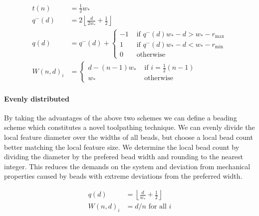 \begin{align*}
t(n) &= \frac12 w_* \\
q^-(d) &= 2 \left\lfloor \frac{d}{ 2w_*} + \frac12 \right\rfloor \\
q(d) &= q^-(d) +
\begin{cases}
-1 & \text{ if } q^-(d) w_* - d > w_* - r_\text{max} \\
1  & \text{ if }  q^-(d) w_* - d < w_* - r_\text{min} \\
0 & \text{ otherwise}
\end{cases}
\\
W(n,d)_i &= 
\begin{cases}
d - (n-1) w_* &\text{ if } i = \frac12 (n-1) \\
w_* &\text{ otherwise }
\end{cases}
\end{align*}





\paragraph{Evenly distributed}
By taking the advantages of the above two schemes we can define a beading scheme which constitutes a novel toolpathing technique.
We can evenly divide the local feature diameter over the widths of all beads, but choose a local bead count better matching the local feature size.
We determine the local bead count by dividing the diameter by the prefered bead width and rounding to the nearest integer.
This reduces the demands on the system and deviation from mechanical properties caused by beads with extreme deviations from the preferred width.



\begin{align*}
q(d) &= \left\lfloor \frac{d}{ w_*} + \frac12 \right\rfloor \\
W(n,d)_i &= d / n \text{ for all } i 
\end{align*}





